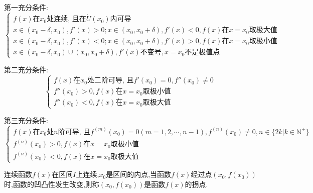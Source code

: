 \begin{theorem}[极值点判别]
	第一充分条件:
	$$\begin{cases} f(x) \text{在} x_{0} \text{处连续, 且在} \mathring{U}(x_{0}) \text{内可导} \\
		 x\in(x_{0}-\delta,x_{0}),f'(x) > 0; x\in(x_{0},x_{0}+\delta), f'(x) < 0, f(x) \text{在} x= x_{0}\text{取极大值}\\
		 x\in(x_{0}-\delta,x_{0}),f'(x) < 0; x\in(x_{0},x_{0}+\delta), f'(x) > 0, f(x) \text{在} x= x_{0}\text{取极小值}\\
		 x\in(x_{0}-\delta,x_{0})\cup(x_{0},x_{0}+\delta), f'(x)\text{不变号}, x = x_{0} \text{不是极值点}
		\end{cases}$$

	第二充分条件:
	$$
	\begin{cases} f(x) \text{在} x_{0} \text{处二阶可导, 且} f'(x_{0}) = 0, f''(x_{0})\neq 0\\
	f''(x_{0}) > 0, f(x) \text{在} x= x_{0}\text{取极小值}\\
	f''(x_{0}) < 0, f(x) \text{在} x= x_{0}\text{取极大值}
	\end{cases}
	$$

	第三充分条件:
	$$
	\begin{cases} f(x) \text{在} x_{0} \text{处} n \text{阶可导, 且} f^{(m)}(x_{0}) = 0(m = 1,2,\cdots,n-1), f^{(n)}(x_{0}) \neq 0, n\in \{2k|k\in \mathbb{N}^{+}\}\\
	f^{(n)}(x_{0}) > 0, f(x) \text{在} x= x_{0}\text{取极小值}\\
	f^{(n)}(x_{0}) < 0, f(x) \text{在} x= x_{0}\text{取极大值}
	\end{cases}
	$$
\end{theorem}

\begin{definition}[拐点]
	连续函数$f(x)$在区间$I$上连续,$x_{0}$是区间的内点,当函数$f(x)$经过点$(x_{0},f(x_{0}))$时,函数的凹凸性发生改变,则称$(x_{0},f(x_{0}))$是函数$f(x)$的拐点.
\end{definition}

